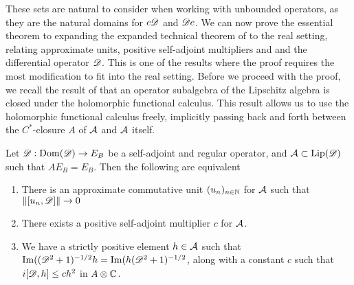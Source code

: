 These sets are natural to consider when working with unbounded operators, as they are the natural domains for $c\mathscr{D}$ and $\mathscr{D} c$.
We can now prove the essential theorem to expanding the expanded technical theorem of \cite{mesrennie} to the real setting, relating approximate units, positive self-adjoint multipliers and and the differential operator $\mathscr{D}$. This is one of the results where the proof requires the most modification to fit into the real setting. 
Before we proceed with the proof, we recall the result of \cite[Theorem 4.24]{mesland} that an operator subalgebra of the Lipschitz algebra is closed under the holomorphic functional calculus. This result allows us to use the holomorphic functional calculus freely, implicitly passing back and forth between the $C^*$-closure $A$ of $\mathcal{A}$ and $\mathcal{A}$ itself. 

\begin{theorem}
	Let $\mathscr{D}:\operatorname{Dom}(\mathscr{D})\to E_B$ be a self-adjoint and regular operator, and $\mathcal{A}\subset \operatorname{Lip}(\mathscr{D})$ such that $AE_B=E_B$. Then the following are equivalent
	\begin{enumerate}
	\item
		There is an approximate commutative unit $(u_n)_{n\in \mathbb{N}}$ for $\mathcal{A}$ such that $\left \Vert [u_n,\mathscr{D}] \right \Vert\to 0$ 
	\item
		There exists a positive self-adjoint multiplier $c$ for $\mathcal{A}$. 
	\item
		We have a strictly positive element $h\in \mathcal{A}$ such that $\operatorname{Im}((\mathscr{D}^2+1)^{-1/2}h=\operatorname{Im}(h(\mathscr{D}^2+1)^{-1/2}$, along with a constant $c$ such that $i[\mathscr{D},h]\leq ch^2$ in $A\otimes \mathbb{C}$.
	\end{enumerate}
\end{theorem}

